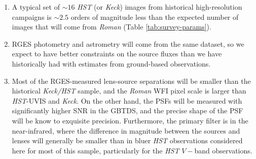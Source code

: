 \documentclass[twocolumn]{aastex631}
\begin{document}
\begin{enumerate}
    \item A typical set of ${\sim}16$ \textit{HST} (or \textit{Keck}) images from historical high-resolution campaigns is ${\sim}2.5$ orders of magnitude less than the expected number of images that will come from \textit{Roman} (Table \ref{tab:survey-params}).
    \item RGES photometry and astrometry will come from the same dataset, so we expect to have better constraints on the source fluxes than we have historically had with estimates from ground-based observations.
    \item Most of the RGES-measured lens-source separations will be smaller than the historical \textit{Keck/HST} sample, and the \textit{Roman} WFI pixel scale is larger than \textit{HST}-UVIS and \textit{Keck}. On the other hand, the PSFs will be measured with significantly higher SNR in the GBTDS, and the precise shape of the PSF will be know to exquisite precision. Furthermore, the primary filter is in the near-infrared, where the difference in magnitude between the sources and lenses will generally be smaller than in bluer \textit{HST} observations considered here for most of this sample, particularly for the \textit{HST} $V-$band observations.
\end{enumerate}
\end{document}
